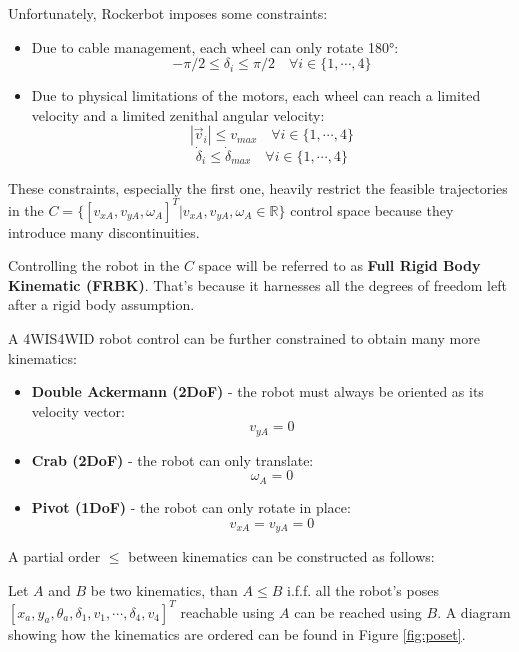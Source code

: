 \documentclass[11pt,a4paper,twocolumn]{article}
\begin{document}
Unfortunately, Rockerbot imposes some constraints:
\begin{itemize}
    \item Due to cable management, each wheel can only rotate 180°: 
    $$
    -\pi/2 \leq \delta_i \leq \pi/2 \quad \forall i \in \{1, \cdots, 4\}
    $$
    \item Due to physical limitations of the motors, each wheel can reach a limited velocity and a limited zenithal angular velocity:
    $$
    |\vec{v}_i| \leq v_{max} \quad \forall i \in \{1, \cdots, 4\}
    $$
    $$
    \dot{\delta}_i \leq \dot{\delta}_{max} \quad \forall i \in \{1, \cdots, 4\}
    $$
\end{itemize}

These constraints, especially the first one, heavily restrict the feasible trajectories in the $C = \{[v_{xA}, v_{yA}, \omega_A]^T|v_{xA}, v_{yA}, \omega_A \in \mathbb{R}\}$ control space because they introduce many discontinuities.

Controlling the robot in the $C$ space will be referred to as \textbf{Full Rigid Body Kinematic (FRBK)}. That's because it harnesses all the degrees of freedom left after a rigid body assumption.

A 4WIS4WID robot control can be further constrained to obtain many more kinematics:
\begin{itemize}
    \item \textbf{Double Ackermann (2DoF)} - the robot must always be oriented as its velocity vector:
    $$
    v_{yA} = 0
    $$

    \item \textbf{Crab (2DoF)} - the robot can only translate:
    $$
    \omega_{A} = 0
    $$

    \item \textbf{Pivot (1DoF)} - the robot can only rotate in place:
    $$
    v_{xA} = v_{yA} = 0
    $$
\end{itemize}

A partial order $\leq$ between kinematics can be constructed as follows:

Let $A$ and $B$ be two kinematics, than $A \leq B$ i.f.f. all the robot's poses $[x_a, y_a, \theta_a, \delta_1, v_1, \cdots, \delta_4,v_4]^T$ reachable using $A$ can be reached using $B$. A diagram showing how the kinematics are ordered can be found in Figure \ref{fig:poset}.
\end{document}
